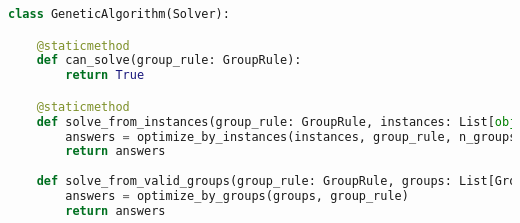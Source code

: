 \begin{apendicesenv}
\begin{lstlisting}[language=Python, caption={Genetic Algorithm Solver Source Code}]
class GeneticAlgorithm(Solver):

    @staticmethod
    def can_solve(group_rule: GroupRule):
        return True

    @staticmethod
    def solve_from_instances(group_rule: GroupRule, instances: List[object]):
        answers = optimize_by_instances(instances, group_rule, n_groups=len(instances))
        return answers
    
    def solve_from_valid_groups(group_rule: GroupRule, groups: List[Group]):
        answers = optimize_by_groups(groups, group_rule)
        return answers
\end{lstlisting}

\end{apendicesenv}
